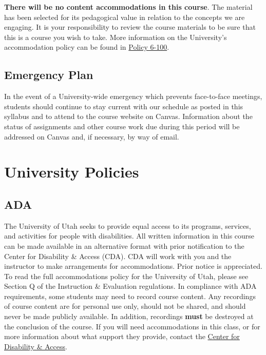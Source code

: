 \documentclass[
  letterpaper,
]{article}
\begin{document}
\textbf{There will be no content accommodations in this course}. The
material has been selected for its pedagogical value in relation to the
concepts we are engaging. It is your responsibility to review the course
materials to be sure that this is a course you wish to take. More
information on the University's accommodation policy can be found in
\href{https://regulations.utah.edu/academics/6-100.php}{Policy 6-100}.

\subsection{Emergency Plan}\label{emergency-plan}

In the event of a University-wide emergency which prevents face-to-face
meetings, students should continue to stay current with our schedule as
posted in this syllabus and to attend to the course website on Canvas.
Information about the status of assignments and other course work due
during this period will be addressed on Canvas and, if necessary, by way
of email.

\section{University Policies}\label{sec-Upolicies}

\subsection{ADA}\label{ada}

The University of Utah seeks to provide equal access to its programs,
services, and activities for people with disabilities. All written
information in this course can be made available in an alternative
format with prior notification to the Center for Disability \& Access
(CDA). CDA will work with you and the instructor to make arrangements
for accommodations. Prior notice is appreciated. To read the full
accommodations policy for the University of Utah, please see Section Q
of the Instruction \& Evaluation regulations. In compliance with ADA
requirements, some students may need to record course content. Any
recordings of course content are for personal use only, should not be
shared, and should never be made publicly available. In addition,
recordings \textbf{must} be destroyed at the conclusion of the course.
If you will need accommodations in this class, or for more information
about what support they provide, contact the
\href{https://disability.utah.edu/}{Center for Disability \& Access}.
\end{document}
